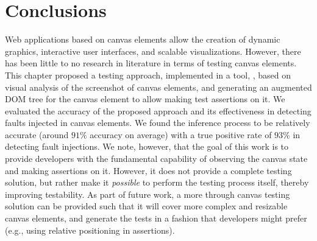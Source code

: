 \section{Conclusions}
\label{sec:conclusions}

Web applications based on canvas elements allow the creation of dynamic graphics, interactive user interfaces, and scalable visualizations. However, there has been little to no research in literature in terms of testing canvas elements. This chapter proposed a testing approach, implemented in a tool, \tool, based on visual analysis of the screenshot of canvas elements, and generating an augmented DOM tree for the canvas element to allow making test assertions on it. We evaluated the accuracy of the proposed approach and its effectiveness in detecting faults injected in canvas elements. We found the inference process to be relatively accurate (around $91\%$ accuracy on average) with a true positive rate of $93\%$ in detecting fault injections. 
We note, however, that the goal of this work is to provide developers with the fundamental capability of observing the canvas state and making assertions on it. However, it does not provide a complete testing solution, but rather make it \emph{possible} to perform the testing process itself, thereby improving testability. As part of future work, a more through canvas testing solution can be provided such that it will cover more complex and resizable canvas elements, and generate the tests in a fashion that developers might prefer (e.g., using relative positioning in assertions). 